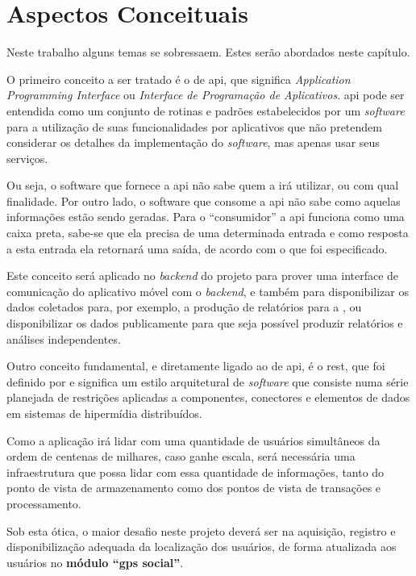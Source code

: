 \chapter{Aspectos Conceituais}\label{chp:aspectosConceituais}
Neste trabalho alguns temas se sobressaem. Estes serão abordados neste capítulo.

O primeiro conceito a ser tratado é o de \gls{api}, que significa \textit{Application Programming Interface} ou \textit{Interface de Programação de Aplicativos}. \gls{api} pode ser entendida como um conjunto de rotinas e padrões estabelecidos por um \textit{software} para a utilização de suas funcionalidades por aplicativos \cite{apifoldoc} que não pretendem considerar os detalhes da implementação do \textit{software}, mas apenas usar seus serviços.

Ou seja, o software que fornece a \gls{api} não sabe quem a irá utilizar, ou com qual finalidade. Por outro lado, o software que consome a \gls{api} não sabe como aquelas informações estão sendo geradas. Para o ``consumidor'' a \gls{api} funciona como uma caixa preta, sabe-se que ela precisa de uma determinada entrada e como resposta a esta entrada ela retornará uma saída, de acordo com o que foi especificado.

Este conceito será aplicado no \textit{backend} do projeto para prover uma interface de comunicação do aplicativo móvel com o \textit{backend}, e também para disponibilizar os dados coletados para, por exemplo, a produção de relatórios para a \sptrans, ou disponibilizar os dados publicamente para que seja possível produzir relatórios e análises independentes.

Outro conceito fundamental, e diretamente ligado ao de \gls{api}, é o \gls{rest}, que foi definido por  e significa um estilo arquitetural de \textit{software} que consiste numa série planejada de restrições aplicadas a componentes, conectores e elementos de dados em sistemas de hipermídia distribuídos.

Como a aplicação irá lidar com uma quantidade de usuários simultâneos da ordem de centenas de milhares, caso ganhe escala, será necessária uma infraestrutura que possa lidar com essa quantidade de informações, tanto do ponto de vista de armazenamento como dos pontos de vista de transações e processamento.

Sob esta ótica, o maior desafio neste projeto deverá ser na aquisição, registro e disponibilização adequada da localização dos usuários, de forma atualizada aos usuários no \textbf{módulo ``gps social''}.

